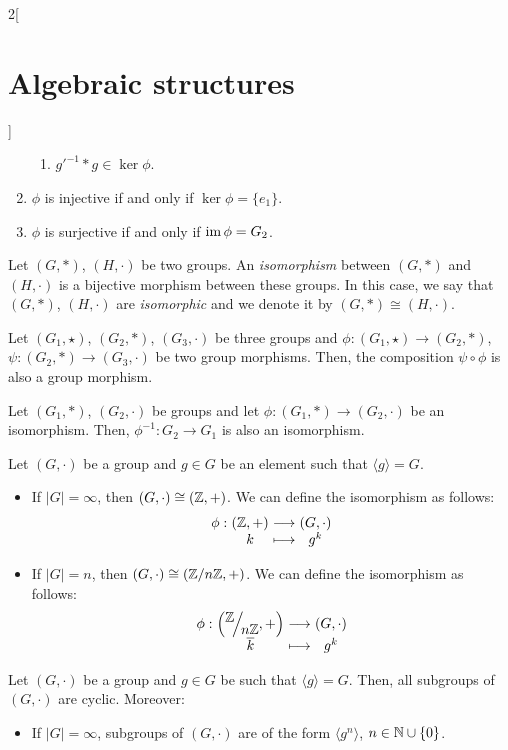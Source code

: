 \documentclass[../../../main_math.tex]{subfiles}
\begin{document}
\begin{multicols}{2}[\section{Algebraic structures}]
\begin{proposition}
\begin{enumerate}
\begin{enumerate}
              \item $g'^{-1}*g\in\ker\phi$.
            \end{enumerate}
      \item $\phi$ is injective if and only if $\ker\phi=\{e_1\}$.
      \item $\phi$ is surjective if and only if $\operatorname{im}\phi=G_2$.
    \end{enumerate}
  \end{proposition}
  \begin{definition}
    Let $(G,*)$, $(H,\cdot)$ be two groups. An \emph{isomorphism} between $(G,*)$ and $(H,\cdot)$ is a bijective morphism between these groups. In this case, we say that $(G,*)$, $(H,\cdot)$ are \emph{isomorphic} and we denote it by $(G,*)\cong (H,\cdot)$.
  \end{definition}
  \begin{proposition}
    Let $(G_1,\star)$, $(G_2,*)$, $(G_3,\cdot)$ be three groups and $\phi:(G_1,\star)\rightarrow (G_2,*)$, $\psi:(G_2,*)\rightarrow (G_3,\cdot)$ be two group morphisms. Then, the composition $\psi\circ\phi$ is also a group morphism.
  \end{proposition}
  \begin{proposition}
    Let $(G_1,*)$, $(G_2,\cdot)$ be groups and let $\phi: (G_1,*)\rightarrow (G_2,\cdot)$ be an isomorphism. Then, $\phi^{-1}: G_2\rightarrow G_1$ is also an isomorphism.
  \end{proposition}
  \begin{theorem}
    Let $(G,\cdot)$ be a group and $g\in G$ be an element such that $\langle g\rangle=G$.
    \begin{itemize}
      \item If $|G|=\infty$, then $(G,\cdot)\cong(\mathbb{Z},+) $. We can define the isomorphism as follows:
            $$\function{\phi}{(\ZZ,+)}{(G,\cdot)}{k}{g^k}$$
      \item If $|G|=n$, then $(G,\cdot)\cong(\mathbb{Z} /n\mathbb{Z},+) $. We can define the isomorphism as follows:
            $$\function{\phi}{\displaystyle\left(\quot{\ZZ}{n\ZZ},+\right)}{(G,\cdot)}{\overline{k}}{g^k}$$
    \end{itemize}
  \end{theorem}
  \begin{corollary}
    Let $(G,\cdot)$ be a group and $g\in G$ be such that $\langle g\rangle=G$. Then, all subgroups of $(G,\cdot)$ are cyclic. Moreover:
    \begin{itemize}
      \item If $|G|=\infty$, subgroups of $(G,\cdot)$ are of the form $\langle g^n\rangle$, $n\in\mathbb{N} \cup\{0\}$.

\end{itemize}
\end{corollary}
\end{multicols}
\end{document}
